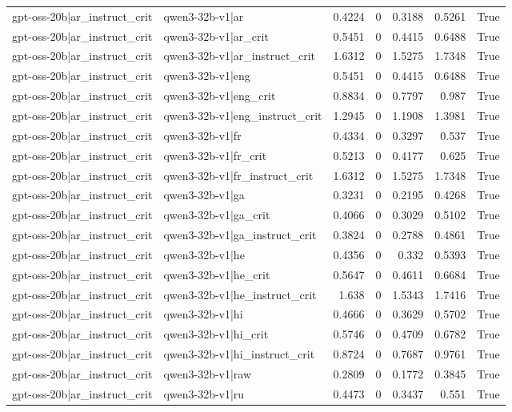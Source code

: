 \begin{table}
\begin{tabular}{l l r r r r l}
gpt-oss-20b|ar_instruct_crit & qwen3-32b-v1|ar & 0.4224 & 0 & 0.3188 & 0.5261 & True \\
gpt-oss-20b|ar_instruct_crit & qwen3-32b-v1|ar_crit & 0.5451 & 0 & 0.4415 & 0.6488 & True \\
gpt-oss-20b|ar_instruct_crit & qwen3-32b-v1|ar_instruct_crit & 1.6312 & 0 & 1.5275 & 1.7348 & True \\
gpt-oss-20b|ar_instruct_crit & qwen3-32b-v1|eng & 0.5451 & 0 & 0.4415 & 0.6488 & True \\
gpt-oss-20b|ar_instruct_crit & qwen3-32b-v1|eng_crit & 0.8834 & 0 & 0.7797 & 0.987 & True \\
gpt-oss-20b|ar_instruct_crit & qwen3-32b-v1|eng_instruct_crit & 1.2945 & 0 & 1.1908 & 1.3981 & True \\
gpt-oss-20b|ar_instruct_crit & qwen3-32b-v1|fr & 0.4334 & 0 & 0.3297 & 0.537 & True \\
gpt-oss-20b|ar_instruct_crit & qwen3-32b-v1|fr_crit & 0.5213 & 0 & 0.4177 & 0.625 & True \\
gpt-oss-20b|ar_instruct_crit & qwen3-32b-v1|fr_instruct_crit & 1.6312 & 0 & 1.5275 & 1.7348 & True \\
gpt-oss-20b|ar_instruct_crit & qwen3-32b-v1|ga & 0.3231 & 0 & 0.2195 & 0.4268 & True \\
gpt-oss-20b|ar_instruct_crit & qwen3-32b-v1|ga_crit & 0.4066 & 0 & 0.3029 & 0.5102 & True \\
gpt-oss-20b|ar_instruct_crit & qwen3-32b-v1|ga_instruct_crit & 0.3824 & 0 & 0.2788 & 0.4861 & True \\
gpt-oss-20b|ar_instruct_crit & qwen3-32b-v1|he & 0.4356 & 0 & 0.332 & 0.5393 & True \\
gpt-oss-20b|ar_instruct_crit & qwen3-32b-v1|he_crit & 0.5647 & 0 & 0.4611 & 0.6684 & True \\
gpt-oss-20b|ar_instruct_crit & qwen3-32b-v1|he_instruct_crit & 1.638 & 0 & 1.5343 & 1.7416 & True \\
gpt-oss-20b|ar_instruct_crit & qwen3-32b-v1|hi & 0.4666 & 0 & 0.3629 & 0.5702 & True \\
gpt-oss-20b|ar_instruct_crit & qwen3-32b-v1|hi_crit & 0.5746 & 0 & 0.4709 & 0.6782 & True \\
gpt-oss-20b|ar_instruct_crit & qwen3-32b-v1|hi_instruct_crit & 0.8724 & 0 & 0.7687 & 0.9761 & True \\
gpt-oss-20b|ar_instruct_crit & qwen3-32b-v1|raw & 0.2809 & 0 & 0.1772 & 0.3845 & True \\
gpt-oss-20b|ar_instruct_crit & qwen3-32b-v1|ru & 0.4473 & 0 & 0.3437 & 0.551 & True \\

\end{tabular}
\end{table}
